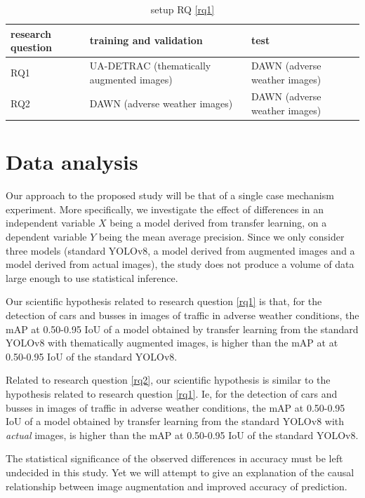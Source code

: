 \documentclass[]{article}
\begin{document}
\begin{table}[H]
	\centering
	\begin{tabular}{lll}
		\toprule
		\textbf{research question} & \textbf{training and validation} & \textbf{test} \\
		\midrule
		RQ1 & UA-DETRAC (thematically augmented images) & DAWN (adverse weather images) \\
		RQ2 & DAWN (adverse weather images) & DAWN (adverse weather images) \\
		\bottomrule
	\end{tabular}
	\caption{setup RQ \ref{rq1}}
	\label{table:setuprq}
\end{table}
\section{Data analysis}

	Our approach to the proposed study will be that of a single case mechanism experiment. More specifically, we investigate the effect of differences in an independent variable $X$ being a model derived from transfer learning, on a dependent variable $Y$ being the mean average precision. Since we only consider three models (standard YOLO{\small v8}, a model derived from augmented images and a model derived from actual images), the study does not produce a volume of data large enough to use statistical inference.
	
	Our scientific hypothesis related to research question \ref{rq1} is that, for the detection of cars and busses in images of traffic in adverse weather conditions, the mAP at 0.50-0.95 IoU of a model obtained by transfer learning from the standard YOLO{\small v8} with thematically augmented images, is higher than the mAP at at 0.50-0.95 IoU of the standard YOLO{\small v8}. 	
	
	Related to research question \ref{rq2}, our scientific hypothesis is similar to the hypothesis related to research question \ref{rq1}. Ie, for the detection of cars and busses in images of traffic in adverse weather conditions, the mAP at 0.50-0.95 IoU of a model obtained by transfer learning from the standard YOLO{\small v8} with  \textit{actual} images, is higher than the mAP at 0.50-0.95 IoU of the standard YOLO{\small v8}.  
	
	The statistical significance of the observed differences in accuracy must be left undecided in this study. Yet we will attempt to give an explanation of the causal relationship between image augmentation and improved accuracy of prediction.
	
\end{document}
